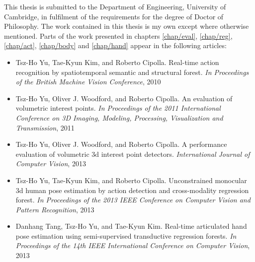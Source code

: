 \begin{declarations}
	This thesis is submitted to the Department of Engineering, University of Cambridge, in fulfilment of the requirements for the degree of Doctor of Philosophy. The work contained in this thesis is my own except where otherwise mentioned. Parts of the work presented in chapters \ref{chap/eval}, \ref{chap/reg}, \ref{chap/act}, \ref{chap/body} and \ref{chap/hand} appear in the following articles:
	\begin{itemize}[]
		\item Tsz-Ho Yu, Tae-Kyun Kim, and Roberto Cipolla. Real-time action recognition by spatiotemporal semantic and structural forest. \textit{In Proceedings of the British Machine Vision Conference}, 2010 %
		\item Tsz-Ho Yu, Oliver J. Woodford, and Roberto Cipolla. An evaluation of volumetric interest points. \textit{In Proceedings of the 2011 International Conference on 3D Imaging, Modeling, Processing, Visualization and Transmission}, 2011 %
		\item Tsz-Ho Yu, Oliver J. Woodford, and Roberto Cipolla. A performance evaluation of volumetric 3d interest point detectors. \textit{International Journal of Computer Vision}, 2013 %
		\item Tsz-Ho Yu, Tae-Kyun Kim, and Roberto Cipolla. Unconstrained monocular 3d human pose estimation by action detection and cross-modality regression forest. \textit{In Proceedings of the 2013 IEEE Conference on Computer Vision and Pattern Recognition}, 2013 %
		\item Danhang Tang, Tsz-Ho Yu, and Tae-Kyun Kim. Real-time articulated hand pose estimation using semi-supervised transductive regression forests. \textit{In Proceedings of the 14th IEEE International Conference on Computer Vision}, 2013 %
	\end{itemize}
\end{declarations}
